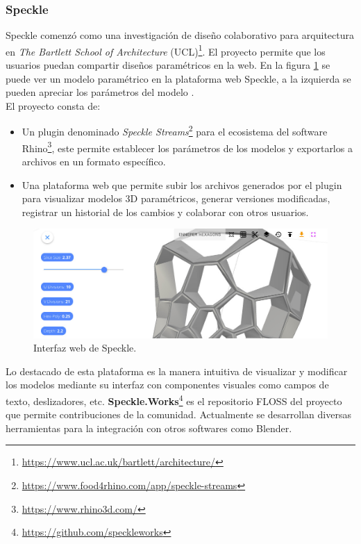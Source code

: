 \subsubsection{Speckle}
\Gls{Speckle} \citep{TheBartlett2015} comenzó como una investigación de diseño colaborativo para arquitectura en \textit{The Bartlett School of Architecture} (UCL)\footnote{\url{https://www.ucl.ac.uk/bartlett/architecture/}}.
El proyecto permite que los usuarios puedan compartir diseños paramétricos en la web. En la figura \ref{fig:spekle} se puede ver un modelo paramétrico en la plataforma web Speckle, a la izquierda se pueden apreciar los parámetros del modelo \citep{Dimitrie2017}. \\
El proyecto consta de:
\begin{itemize}
    \item Un plugin denominado \textit{Speckle Streams}\footnote{\url{https://www.food4rhino.com/app/speckle-streams}}  para el ecosistema del software  Rhino\footnote{\url{https://www.rhino3d.com/}}, este permite establecer los parámetros de los modelos y exportarlos a archivos en un formato específico.
    \item Una plataforma web que permite subir los archivos generados por el plugin para visualizar modelos 3D paramétricos, generar versiones modificadas, registrar un historial de los cambios y colaborar con otros usuarios.
\end{itemize}

\begin{figure}[h]
\includegraphics[width=14cm]{Img/Desarrollo/speckle.jpg}
\centering
\caption{\footnotesize{Interfaz web de Speckle.}}
\label{fig:spekle}
\end{figure}

Lo destacado de esta plataforma es la manera intuitiva de visualizar y modificar los modelos mediante su interfaz con componentes visuales como campos de texto, deslizadores, etc. \textbf{Speckle.Works}\footnote{\url{https://github.com/speckleworks}} es el repositorio FLOSS del proyecto que permite contribuciones de la comunidad. Actualmente se desarrollan diversas herramientas para la integración con otros softwares como Blender. 


